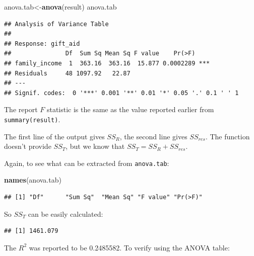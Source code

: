 \documentclass[
]{book}
\newenvironment{Shaded}{\begin{snugshade}}{\end{snugshade}}
\newcommand{\DecValTok}[1]{\textcolor[rgb]{0.00,0.00,0.81}{#1}}
\newcommand{\FunctionTok}[1]{\textcolor[rgb]{0.13,0.29,0.53}{\textbf{#1}}}
\newcommand{\NormalTok}[1]{#1}
\newcommand{\OtherTok}[1]{\textcolor[rgb]{0.56,0.35,0.01}{#1}}
\newcommand{\SpecialCharTok}[1]{\textcolor[rgb]{0.81,0.36,0.00}{\textbf{#1}}}
\newcommand{\StringTok}[1]{\textcolor[rgb]{0.31,0.60,0.02}{#1}}
\begin{document}
\begin{Shaded}
\begin{Highlighting}[]
\NormalTok{anova.tab}\OtherTok{\textless{}{-}}\FunctionTok{anova}\NormalTok{(result)}
\NormalTok{anova.tab}
\end{Highlighting}
\end{Shaded}

\begin{verbatim}
## Analysis of Variance Table
## 
## Response: gift_aid
##               Df  Sum Sq Mean Sq F value    Pr(>F)    
## family_income  1  363.16  363.16  15.877 0.0002289 ***
## Residuals     48 1097.92   22.87                      
## ---
## Signif. codes:  0 '***' 0.001 '**' 0.01 '*' 0.05 '.' 0.1 ' ' 1
\end{verbatim}

The report \(F\) statistic is the same as the value reported earlier from \texttt{summary(result)}.

The first line of the output gives \(SS_{R}\), the second line gives \(SS_{res}\). The function doesn't provide \(SS_T\), but we know that \(SS_T = SS_{R} + SS_{res}\).

Again, to see what can be extracted from \texttt{anova.tab}:

\begin{Shaded}
\begin{Highlighting}[]
\FunctionTok{names}\NormalTok{(anova.tab)}
\end{Highlighting}
\end{Shaded}

\begin{verbatim}
## [1] "Df"      "Sum Sq"  "Mean Sq" "F value" "Pr(>F)"
\end{verbatim}

So \(SS_T\) can be easily calculated:

\begin{Shaded}
\end{Shaded}

\begin{verbatim}
## [1] 1461.079
\end{verbatim}

The \(R^2\) was reported to be 0.2485582. To verify using the ANOVA table:

\begin{Shaded}
\end{Shaded}
\end{document}
